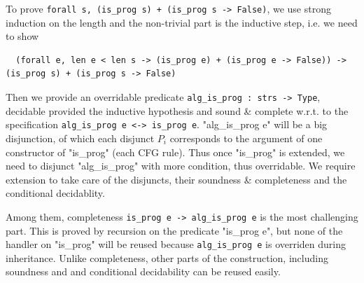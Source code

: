 To prove \texttt{forall s, (is_prog s) + (is_prog s -> False)}, we use strong induction on the length and the non-trivial part is  the inductive step, i.e. we need to show
\begin{verbatim}
  (forall e, len e < len s -> (is_prog e) + (is_prog e -> False)) -> (is_prog s) + (is_prog s -> False)
\end{verbatim}


Then we provide an overridable predicate \texttt{alg_is_prog : strs -> Type},
decidable provided the inductive hypothesis and sound \& complete w.r.t. to the specification \texttt{alg_is_prog e  <-> is_prog e}.  "alg_is_prog e" will be a big disjunction, of which each disjunct $P_i$ corresponds to the argument of one constructor of "is_prog" (each CFG rule). Thus once "is_prog" is extended, we need to disjunct "alg_is_prog" with more condition, thus overridable.  We require extension to take care of the disjuncts, their soundness \& completeness and the conditional decidablity.

Among them, completeness \texttt{is_prog e -> alg_is_prog e} is
the most challenging part. This is proved by recursion on the predicate
"is_prog e", but none of the handler on "is_prog" will be reused
because \texttt{alg_is_prog e} is overriden during
inheritance.
Unlike completeness, other parts of the construction, including
soundness and and conditional decidability can be reused easily.
